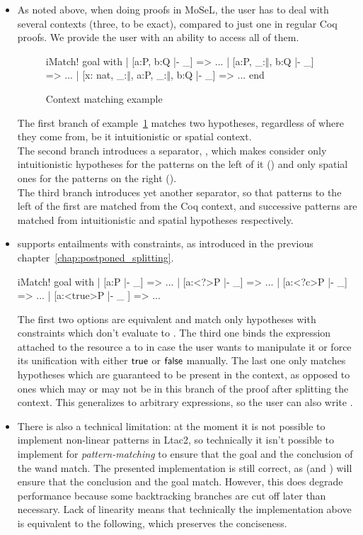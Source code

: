 \begin{itemize}
\item As noted above, when doing proofs in MoSeL, the user has to deal with several contexts (three, to be exact), compared to just one in regular Coq proofs.
  We provide the user with an ability to access all of them.
  \begin{figure}[H]
  \begin{coq}
       iMatch! goal with
       | [a:P, b:Q |- _] => ...
       | [a:P, _:$\Vert$, b:Q |- _] => ...
       | [x: nat, _:$\Vert$, a:P, _:$\Vert$, b:Q |- _] => ...
       end
   \end{coq}
   \caption{Context matching example}
   \label{fig:example:contex_matching}
  \end{figure}
  The first branch of example~\ref{fig:example:contex_matching} matches two hypotheses, regardless of where they come from, be it intuitionistic or spatial context.\\
  The second branch introduces a separator, \coqe{_:$\Vert$}, which makes  consider only intuitionistic hypotheses for the patterns on the left of it () and only spatial ones for the patterns on the right ().\\
  The third branch introduces yet another separator, so that patterns to the left of the first \coqe{_:$\Vert$} are matched from the Coq context, and successive patterns are matched from intuitionistic and spatial hypotheses respectively.

\item {} supports entailments with constraints, as introduced in the previous chapter~\ref{chap:postponed_splitting}.
\begin{coq}
iMatch! goal with
| [a:P |- _] => ...
| [a:<?>P |- _] => ...
| [a:<?c>P |- _] => ...
| [a:<true>P |- _ ] => ...
\end{coq}
The first two options are equivalent and match only hypotheses with constraints which don't evaluate to \false.
The third one binds the expression attached to the resource a to  in case the user wants to manipulate it or force its unification with either $\textsf{true}$ or $\textsf{false}$ manually.
The last one only matches hypotheses which are guaranteed to be present in the context, as opposed to ones which may or may not be in this branch of the proof after splitting the context.
This generalizes to arbitrary expressions, so the user can also write .
\item There is also a technical limitation: at the moment it is not possible to implement non-linear patterns in Ltac2, so technically it isn't possible to implement  for \emph{pattern-matching} to ensure that the goal and the conclusion of the wand match.
  The presented implementation is still correct, as  (and ) will ensure that the conclusion and the goal match.
  However, this does degrade performance because some backtracking branches are cut off later than necessary.
  Lack of linearity means that technically the implementation above is equivalent to the following, which preserves the conciseness.


\end{itemize}
